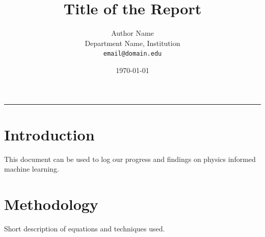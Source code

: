 \documentclass[10pt]{article}
\title{\vspace{-1.5cm}\textbf{Title of the Report}}
\author{Author Name \\
	Department Name, Institution \\
	\texttt{email@domain.edu}}
\date{\vspace{-1em}\today}
\begin{document}
	\maketitle
	\vspace{-1em}
	\hrule
	\vspace{0.5em}
	
	\section{Introduction}
	This document can be used to log our progress and findings on physics informed machine learning.
	
	\section{Methodology}
	Short description of equations and techniques used.
	
\end{document}
